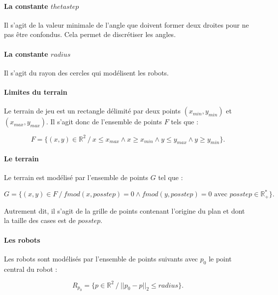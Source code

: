 \documentclass{article}
\begin{document}
\paragraph{La constante $thetastep$} Il s'agit de la valeur minimale de l'angle que doivent former deux droites pour ne pas être confondus. Cela permet de discrétiser les angles.

\paragraph{La constante $radius$} Il s'agit du rayon des cercles qui modélisent les robots.

\paragraph{Limites du terrain} Le terrain de jeu est un rectangle délimité par deux points $(x_{min}, y_{min})$ et $(x_{max}, y_{max})$. Il s'agit donc de l'ensemble de points $F$ tels que :

\begin{equation*}
F = \{ (x, y) \in \mathbb{R}^2 \ /\  x \leqslant x_{max} \wedge x \geqslant x_{min} \wedge y \leqslant y_{max} \wedge y \geqslant y_{min} \}.
\end{equation*}

\paragraph{Le terrain} Le terrain est modélisé par l'ensemble de points $G$ tel que :

\begin{equation*}
G = \{ (x, y) \in F \ /\  fmod(x, posstep) = 0 \wedge fmod(y, posstep) = 0 \text{ avec } posstep \in \mathbb{R}^*_+ \}.
\end{equation*}

Autrement dit, il s'agit de la grille de points contenant l'origine du plan et dont la taille des cases est de $posstep$.

\paragraph{Les robots} Les robots sont modélisés par l'ensemble de points suivants avec $p_0$ le point central du robot :

\begin{equation*}
    R_{p_0} = \{ p \in \mathbb{R}^2 \ /\  ||p_0 - p||_2 \leqslant radius \}.
\end{equation*}
\end{document}
